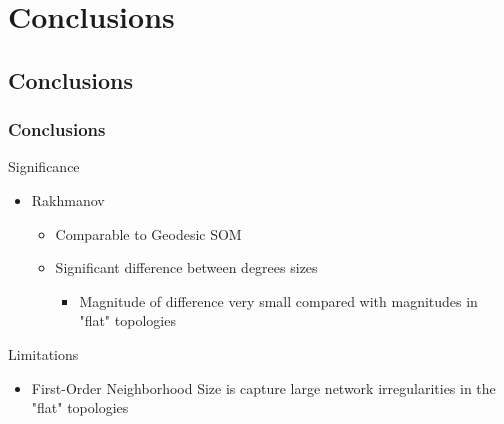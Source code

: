 \documentclass[nototal,handout]{beamer}
\begin{document}
\section{Conclusions} 

\subsection{Conclusions} 

\begin{frame}
	\frametitle{Conclusions}
 
\begin{block}{Significance}
 \begin{itemize}
 \item  Rakhmanov 
 \begin{itemize}
 \item  Comparable to Geodesic SOM
 \item  Significant difference between degrees sizes
 \begin{itemize}
 \item  Magnitude of difference very small compared with magnitudes in "flat" topologies
 \end{itemize}
 \end{itemize}
 \end{itemize}
 \end{block} 
\begin{block}{Limitations}
 \begin{itemize}
 \item  First-Order Neighborhood Size is capture large network irregularities in the "flat" topologies
 \end{itemize}
 \end{block} \end{frame}
\end{document}
